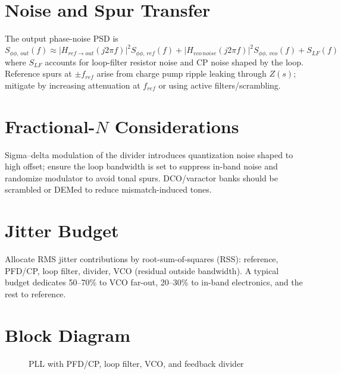 \section{Noise and Spur Transfer}
The output phase-noise PSD is
\[
 S_{\phi\phi,\,out}(f) \approx |H_{ref\to out}(j2\pi f)|^2 S_{\phi\phi,\,ref}(f) + |H_{vco\,noise}(j2\pi f)|^2 S_{\phi\phi,\,vco}(f) + S_{LF}(f)
\]
where \(S_{LF}\) accounts for loop-filter resistor noise and CP noise shaped by the loop. Reference spurs at \(\pm f_{ref}\) arise from charge pump ripple leaking through \(Z(s)\); mitigate by increasing attenuation at \(f_{ref}\) or using active filters/scrambling.

\section{Fractional-$N$ Considerations}
Sigma–delta modulation of the divider introduces quantization noise shaped to high offset; ensure the loop bandwidth is set to suppress in-band noise and randomize modulator to avoid tonal spurs. DCO/varactor banks should be scrambled or DEMed to reduce mismatch-induced tones.

\section{Jitter Budget}
Allocate RMS jitter contributions by root-sum-of-squares (RSS): reference, PFD/CP, loop filter, divider, VCO (residual outside bandwidth). A typical budget dedicates 50–70\% to VCO far-out, 20–30\% to in-band electronics, and the rest to reference.

\section{Block Diagram}
\begin{figure}[H]
  \centering
  \caption{PLL with PFD/CP, loop filter, VCO, and feedback divider}
\end{figure}

